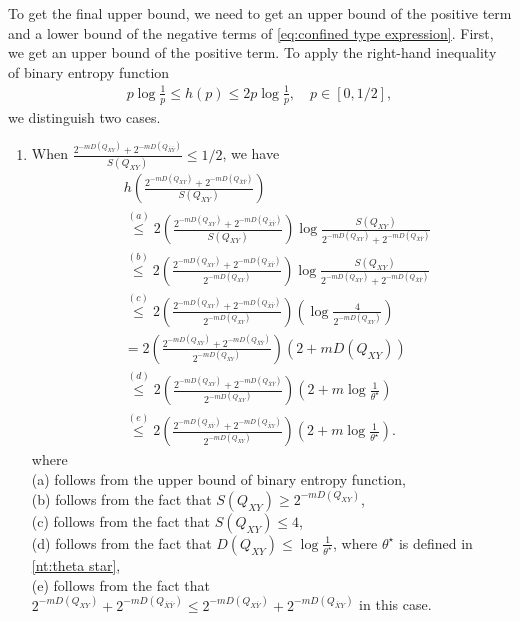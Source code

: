 \documentclass[journal,onecolumn]{IEEEtran}
\theoremstyle{definition}
\theoremstyle{remark}
\newcommand{\Dxy}{D({Q_{XY}})}
\newcommand{\Dxby}{D({Q_{X\bar{Y}}})}
\newcommand{\Dbxy}{D({Q_{\bar{X}Y}})}
\newcommand{\Dbxby}{D({Q_{\bar{X}\bar{Y}}})}
\newcommand{\Qxy}{Q_{XY}}
\begin{document}
    
    To get the final upper bound, we need to get an upper bound of the positive term and a lower bound of the negative terms of \eqref{eq:confined type expression}.
    First, we get an upper bound of the positive term.
    To apply the right-hand inequality of binary entropy function
    \begin{align*}
        p \log \frac{1}{p} \leq h(p) \leq 2p \log \frac{1}{p}, \quad p \in [0,1/2],
    \end{align*}
    we distinguish two cases.
    \begin{enumerate}
        \item 
        When $\frac{2^{-m\Dxy}+2^{-m\Dbxby}}{S(\Qxy)} \leq 1/2$, we have
        \begin{align*}
            &h\left(\frac{2^{-m\Dxy}+2^{-m\Dbxby}}{S(\Qxy)}\right)\\
            &\overset{(a)}{\leq} 2\left(\frac{2^{-m\Dxy}+2^{-m\Dbxby}}{S(\Qxy)}\right)\log \frac{S(\Qxy)}{2^{-m\Dxy}+2^{-m\Dbxby}}\\
            &\overset{(b)}{\leq} 2\left(\frac{2^{-m\Dxy}+2^{-m\Dbxby}}{2^{-m\Dxy}}\right) \log \frac{S(\Qxy)}{2^{-m\Dxy}+2^{-m\Dbxby}}\\
            &\overset{(c)}{\leq} 2\left(\frac{2^{-m\Dxy}+2^{-m\Dbxby}}{2^{-m\Dxy}}\right) \left(\log \frac{4}{2^{-m\Dxy}}\right)\\
            &= 2\left(\frac{2^{-m\Dxy}+2^{-m\Dbxby}}{2^{-m\Dxy}}\right) \left(2 +m\Dxy\right)\\
            &\overset{(d)}{\leq} 2\left(\frac{2^{-m\Dxy}+2^{-m\Dbxby}}{2^{-m\Dxy}}\right) \left(2 + m \log \frac{1}{\theta^\star} \right)\\
            &\overset{(e)}{\leq} 2\left(\frac{2^{-m\Dxby}+2^{-m\Dbxy}}{2^{-m\Dxy}}\right) \left(2 + m \log \frac{1}{\theta^\star}\right).
        \end{align*}
        where \\
        (a) follows from the upper bound of binary entropy function, \\
        (b) follows from the fact that $S(\Qxy)\geq 2^{-m\Dxy}$, \\
        (c) follows from the fact that $S(\Qxy) \leq 4$, \\
        (d) follows from the fact that $\Dxy \leq \log \frac{1}{\theta^\star}$, where $\theta^\star$ is defined in \eqref{nt:theta star},\\
        (e) follows from the fact that $2^{-m\Dxy}+2^{-m\Dbxby} \leq 2^{-m\Dxby}+2^{-m\Dbxy}$ in this case.


\end{enumerate}
\end{document}
